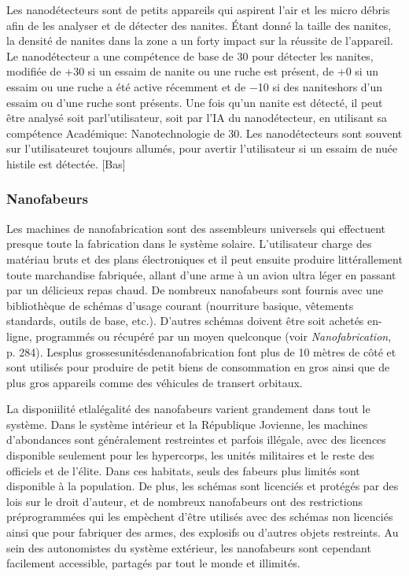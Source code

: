 Les nanodétecteurs sont de petits appareils qui aspirent l'air et les micro débris afin de les analyser et de détecter des nanites. Étant donné la taille des nanites, la densité de nanites dans la zone a un forty impact sur la réussite de l'appareil. Le nanodétecteur a une compétence de base de 30 pour détecter les nanites, modifiée de +30 si un essaim de nanite ou une ruche est présent, de +0 si un essaim ou une ruche a été active récemment et de $-$10 si des naniteshors d'un essaim ou d'une ruche sont présents. Une fois qu'un nanite est détecté, il peut être analysé soit parl'utilisateur, soit par l'IA du nanodétecteur, en utilisant sa compétence Académique: Nanotechnologie de 30. Les nanodétecteurs sont souvent sur l'utilisateuret toujours allumés, pour avertir l'utilisateur si un essaim de nuée histile est détectée. [Bas] 

\subsubsection{Nanofabeurs} 

Les machines de nanofabrication sont des assembleurs universels qui effectuent presque toute la fabrication dans le système solaire. L'utilisateur charge des matériau bruts et des plans électroniques et il peut ensuite produire littérallement toute marchandise fabriquée, allant d'une arme à un avion ultra léger en passant par un délicieux repas chaud. De nombreux nanofabeurs sont fournis avec une bibliothèque de schémas d'usage courant (nourriture basique, vêtements standards, outils de base, etc.). D'autres schémas doivent être soit achetés en-ligne, programmés ou récupéré par un moyen quelconque (voir \emph{Nanofabrication}, p. 284). Lesplus grossesunitésdenanofabrication font plus de 10 mètres de côté et sont utilisés pour produire de petit biens de consommation en gros ainsi que de plus gros appareils comme des véhicules de transert orbitaux. 

La disponiilité etlalégalité des nanofabeurs varient grandement dans tout le système. Dans le système intérieur et la République Jovienne, les machines d'abondances sont généralement restreintes et parfois illégale, avec des licences disponible seulement pour les hypercorps, les unités militaires et le reste des officiels et de l'élite. Dans ces habitats, seuls des fabeurs plus limités sont disponible à la population. De plus, les schémas sont licenciés et protégés par des lois sur le droit d'auteur, et de nombreux nanofabeurs ont des restrictions préprogrammées qui les empèchent d'être utilisés avec des schémas non licenciés ainsi que pour fabriquer des armes, des explosifs ou d'autres objets restreints. Au sein des autonomistes du système extérieur, les nanofabeurs sont cependant facilement accessible, partagés par tout le monde et illimités. 

